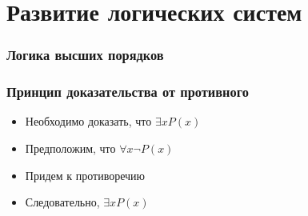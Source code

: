 \documentclass[24pt,pdf,hyperref={unicode},aspectratio=169]{beamer}
\begin{document}
\section{Развитие логических систем}

\begin{frame}\frametitle{Логика высших порядков}




\end{frame}

\begin{frame}\frametitle{Принцип доказательства от противного}

\begin{itemize}
\item<+-> Необходимо доказать, что $\exists x P(x)$
\item<+-> Предположим, что $\forall x \neg P(x)$
\item<+-> Придем к противоречию
\item<+-> Следовательно, $\exists x P(x)$
\end{itemize}
\end{frame}
\end{document}
